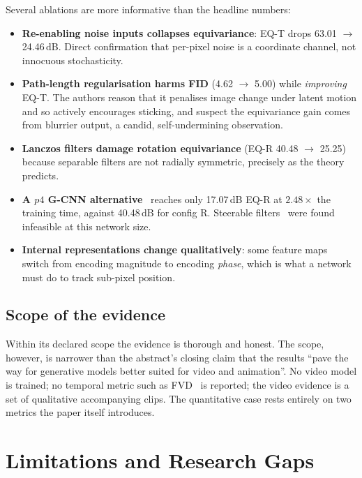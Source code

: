 \documentclass[11pt,a4paper]{article}
\begin{document}
Several ablations are more informative than the headline numbers:
\begin{itemize}[leftmargin=1.4em,itemsep=0.2em]
  \item \textbf{Re-enabling noise inputs collapses equivariance}: EQ-T drops
        63.01 $\to$ 24.46\,dB. Direct confirmation that per-pixel noise is a
        coordinate channel, not innocuous stochasticity.
  \item \textbf{Path-length regularisation harms FID} (4.62 $\to$ 5.00) while
        \emph{improving} EQ-T. The authors reason that it penalises image change
        under latent motion and so actively encourages sticking, and suspect the
        equivariance gain comes from blurrier output, a candid,
        self-undermining observation.
  \item \textbf{Lanczos filters damage rotation equivariance} (EQ-R 40.48 $\to$
        25.25) because separable filters are not radially symmetric, precisely
        as the theory predicts.
  \item \textbf{A $p4$ G-CNN alternative}~\citep{cohen2016gcnn} reaches only
        17.07\,dB EQ-R at $2.48\times$ the training time, against 40.48\,dB for
        config R. Steerable filters~\citep{weiler2019e2cnn} were found infeasible
        at this network size.
  \item \textbf{Internal representations change qualitatively}: some feature maps
        switch from encoding magnitude to encoding \emph{phase}, which is what a
        network must do to track sub-pixel position.
\end{itemize}

\subsection{Scope of the evidence}

Within its declared scope the evidence is thorough and honest. The scope,
however, is narrower than the abstract's closing claim that the results ``pave
the way for generative models better suited for video and animation''. No video
model is trained; no temporal metric such as FVD~\citep{unterthiner2018fvd} is
reported; the video evidence is a set of qualitative accompanying clips. The
quantitative case rests entirely on two metrics the paper itself introduces.

\section{Limitations and Research Gaps}
\label{sec:limits}
\end{document}
